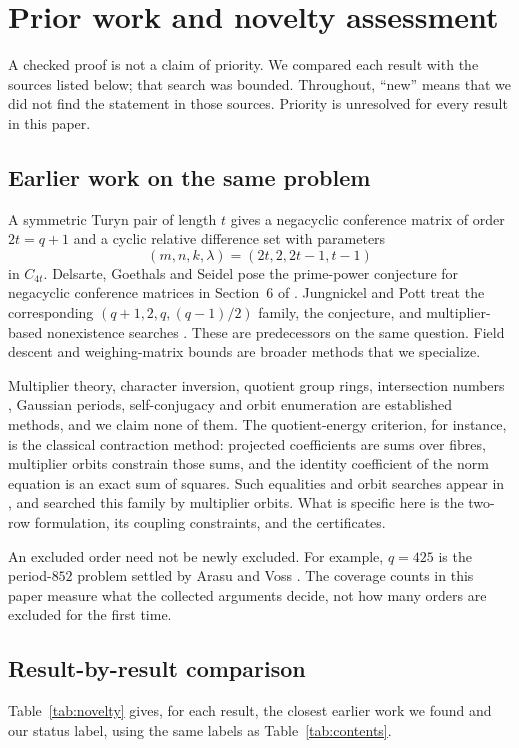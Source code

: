 \documentclass[11pt]{article}
\theoremstyle{definition}
\theoremstyle{remark}
\begin{document}
\section{Prior work and novelty assessment}
\label{sec:novelty}

A checked proof is not a claim of priority. We compared each result with
the sources listed below; that search was bounded. Throughout, ``new''
means that we did not find the statement in those sources. Priority is
unresolved for every result in this paper.

\subsection{Earlier work on the same problem}
A symmetric Turyn pair of length $t$ gives a negacyclic conference matrix of
order $2t=q+1$ and a cyclic relative difference set with parameters
\[
 (m,n,k,\lambda)=(2t,2,2t-1,t-1)
\]
in $C_{4t}$. Delsarte, Goethals and Seidel pose the prime-power conjecture
for negacyclic conference matrices in Section~6 of \cite{DGS71}.
Jungnickel and Pott treat the corresponding $(q+1,2,q,(q-1)/2)$ family,
the conjecture, and multiplier-based nonexistence searches
\cite[pp.~344--347]{JP99}. These are predecessors on the same question.
Field descent and weighing-matrix bounds \cite{Schmidt99,LS05,Tan18} are
broader methods that we specialize.

Multiplier theory, character inversion, quotient group rings,
intersection numbers \cite{Turyn65}, Gaussian periods, self-conjugacy and orbit
enumeration are established methods, and we claim none of them. The
quotient-energy criterion, for instance, is the classical contraction
method: projected coefficients are sums over fibres, multiplier orbits
constrain those sums, and the identity coefficient of the norm equation is
an exact sum of squares. Such equalities and orbit searches appear in
\cite{AGZ21,Gordon26}, and \cite{JP99} searched this family by multiplier
orbits. What is specific here is the two-row formulation, its coupling
constraints, and the certificates.

An excluded order need not be newly excluded. For example, $q=425$ is the
period-$852$ problem settled by Arasu and Voss \cite{AV99}. The coverage
counts in this paper measure what the collected arguments decide, not how
many orders are excluded for the first time.

\subsection{Result-by-result comparison}
Table~\ref{tab:novelty} gives, for each result, the closest earlier work we
found and our status label, using the same labels as Table~\ref{tab:contents}.
\end{document}
